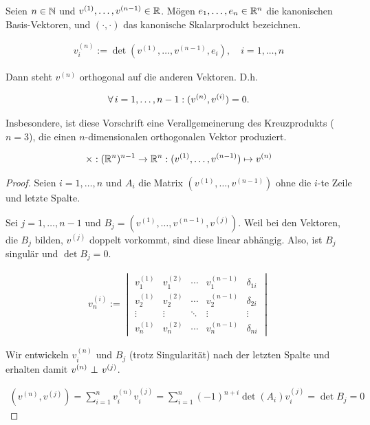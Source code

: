 \begin{theorem*}

Seien $n \in \mathbb{N}$ und $v^{(1)}, \ldots, v^{(n-1)} \in \mathbb{R}$.
Mögen $e_1, \ldots, e_n \in \mathbb{R}^n$ die kanonischen Basis-Vektoren, und $(\cdot, \cdot)$ das kanonische Skalarprodukt bezeichnen.

\begin{align*}
  v^{(n)}_i := \det{(v^{(1)}, \ldots, v^{(n-1)}, e_i)},
  \quad
  i = 1, \ldots, n
\end{align*}

Dann steht $v^{(n)}$ orthogonal auf die anderen Vektoren.
D.h.

\begin{align*}
  \forall \, i = 1, \ldots, n-1:
  (v^{(n)}, v^{(i)}) = 0.
\end{align*}

Insbesondere, ist diese Vorschrift eine Verallgemeinerung des Kreuzprodukts ($n = 3$), die einen $n$-dimensionalen orthogonalen Vektor produziert.

\begin{align*}
  \times:
  (\mathbb{R}^n)^{n-1} \to \mathbb{R}^n:
  (v^{(1)}, \ldots, v^{(n-1)})
  \mapsto
  v^{(n)}
\end{align*}

\end{theorem*}

\begin{proof}

Seien $i = 1, \ldots, n$ und $A_i$ die Matrix $(v^{(1)}, \ldots, v^{(n-1)})$ ohne die $i$-te Zeile und letzte Spalte.

Sei $j = 1, \ldots, n-1$ und $B_j = (v^{(1)}, \ldots, v^{(n-1)}, v^{(j)})$.
Weil bei den Vektoren, die $B_j$ bilden, $v^{(j)}$ doppelt vorkommt, sind diese linear abhängig.
Also, ist $B_j$ singulär und $\det{B_j} = 0$.

\begin{align*}
  v^{(i)}_n
  :=
  \begin{vmatrix}
    v^{(1)}_1 & v^{(2)}_1 & \cdots & v^{(n-1)}_1 & \delta_{1 i} \\
    v^{(1)}_2 & v^{(2)}_2 & \cdots & v^{(n-1)}_2 & \delta_{2 i} \\
    \vdots    & \vdots    & \ddots & \vdots      & \vdots \\
    v^{(1)}_n & v^{(2)}_n & \cdots & v^{(n-1)}_n & \delta_{n i}
  \end{vmatrix}
\end{align*}

Wir entwickeln $v^{(n)}_i$ und $B_j$ (trotz Singularität) nach der letzten Spalte und erhalten damit $v^{(n)} ~\bot_{}~ v^{(j)}$.

\begin{align*}
  (v^{(n)}, v^{(j)})
  =
  \sum_{i=1}^n
  v^{(n)}_i
  v^{(j)}_i
  =
  \sum_{i=1}^n
  (-1)^{n + i} \det{(A_i)}
  v^{(j)}_i
  =
  \det{B_j} = 0
\end{align*}

\end{proof}
